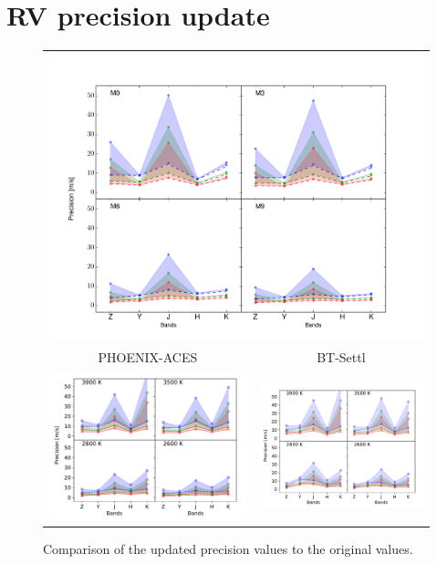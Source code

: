 
\section{RV precision update}
\label{sec:rv_precision_values}

\begin{figure}
    \centering
    \begin{tabular}{cc}
        \multicolumn{2}{c}{\citet{figueira_radial_2016}}\\
        \multicolumn{2}{c}{\includegraphics[width=0.48\linewidth]{figures/information-content/Rvprec_vsini1.pdf}}\\
        {PHOENIX-ACES} & {BT-Settl}\\
        \includegraphics[width=0.47\linewidth]{figures/information-content/aces_4panel} &
        \includegraphics[width=0.47\linewidth]{figures/information-content/btsettl_4panel} \\
    \end{tabular}
    \caption[Comparision of {RV} precision results to~\citet{figueira_radial_2016}.]{Comparison of the updated precision values to the original values.
}
\end{figure}
